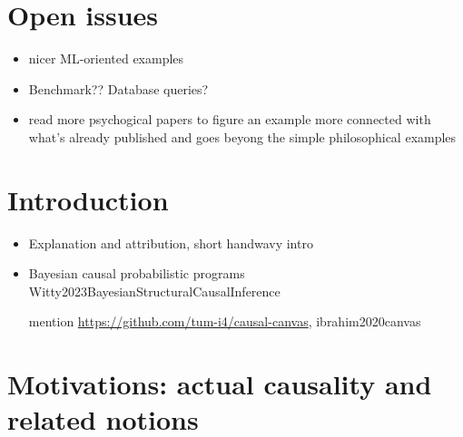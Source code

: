 \documentclass{article}
\begin{document}
\section{Open issues}

\begin{itemize}
\item nicer ML-oriented examples
\item Benchmark?? Database queries?
\item read more psychogical papers to figure an example more connected with what's already published and goes beyong the simple philosophical examples

\end{itemize}


\section{Introduction}

\begin{itemize}

\item Explanation and attribution, short handwavy intro

\item  Bayesian causal probabilistic programs Witty2023BayesianStructuralCausalInference

mention \url{https://github.com/tum-i4/causal-canvas}, ibrahim2020canvas


\end{itemize}


\section{Motivations: actual causality and related notions}
\end{document}
